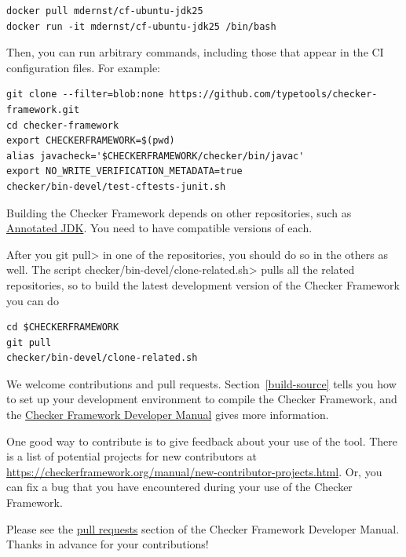 \begin{Verbatim}
docker pull mdernst/cf-ubuntu-jdk25
docker run -it mdernst/cf-ubuntu-jdk25 /bin/bash
\end{Verbatim}

Then, you can run arbitrary commands, including those that appear in the
CI configuration files.  For example:

\begin{Verbatim}
git clone --filter=blob:none https://github.com/typetools/checker-framework.git
cd checker-framework
export CHECKERFRAMEWORK=$(pwd)
alias javacheck='$CHECKERFRAMEWORK/checker/bin/javac'
export NO_WRITE_VERIFICATION_METADATA=true
checker/bin-devel/test-cftests-junit.sh
\end{Verbatim}



Building the Checker Framework depends on other repositories, such as
\href{https://github.com/typetools/jdk/}{Annotated JDK}.
You need to have compatible versions of each.

After you \<git pull> in one of the repositories, you should do so in the
others as well.  The script \<checker/bin-devel/clone-related.sh> pulls all the
related repositories, so to build the latest development version of the
Checker Framework you can do

\begin{Verbatim}
cd $CHECKERFRAMEWORK
git pull
checker/bin-devel/clone-related.sh
\end{Verbatim}



We welcome contributions and pull requests.  Section~\ref{build-source}
tells you how to set up your development environment to compile the Checker
Framework, and the
\href{https://checkerframework.org/manual/developer-manual.html}{Checker
  Framework Developer Manual} gives more information.

One good way to contribute is to give feedback about your use of the tool.
There is a list
of potential projects for new contributors at
\url{https://checkerframework.org/manual/new-contributor-projects.html}.
Or, you can fix a bug that
you have encountered during your use of the Checker Framework.



Please see the
\href{https://checkerframework.org/manual/developer-manual.html#pull-requests}{pull
  requests} section of the Checker Framework Developer Manual.
Thanks in advance for your contributions!

